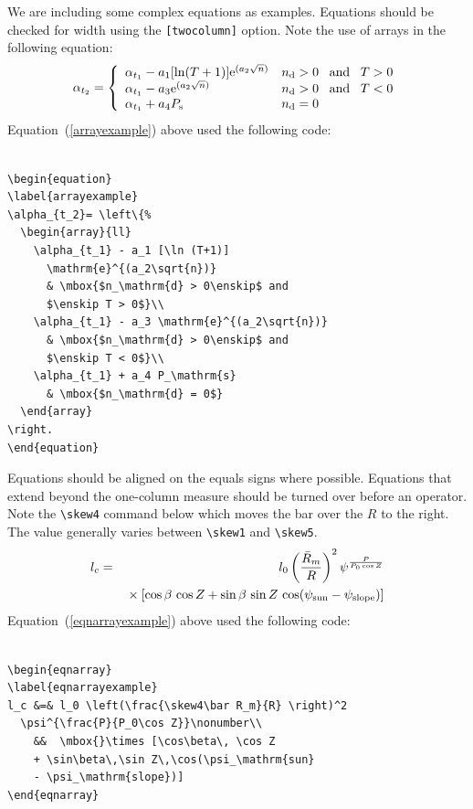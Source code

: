 \documentclass[twocolumn]{igs}
\begin{document}
We are including some complex equations as examples. Equations should be checked for width using the \verb"[twocolumn]" option. Note the use of arrays in the following equation:
\begin{equation}
\label{arrayexample}
\alpha_{t_2}= \left\{%
  \begin{array}{ll}
    \alpha_{t_1} - a_1 [\ln (T+1)]
      \mathrm{e}^{(a_2\sqrt{n})}
      & \mbox{$n_\mathrm{d} > 0\enskip$ and
      $\enskip T > 0$}\\
    \alpha_{t_1} - a_3 \mathrm{e}^{(a_2\sqrt{n})}
      & \mbox{$n_\mathrm{d} > 0\enskip$ and
      $\enskip T < 0$}\\
    \alpha_{t_1} + a_4 P_\mathrm{s}
      & \mbox{$n_\mathrm{d} = 0$}
  \end{array}
\right.
\end{equation}
Equation~(\ref{arrayexample}) above used the following code:
\begin{verbatim}

\begin{equation}
\label{arrayexample}
\alpha_{t_2}= \left\{%
  \begin{array}{ll}
    \alpha_{t_1} - a_1 [\ln (T+1)]
      \mathrm{e}^{(a_2\sqrt{n})}
      & \mbox{$n_\mathrm{d} > 0\enskip$ and
      $\enskip T > 0$}\\
    \alpha_{t_1} - a_3 \mathrm{e}^{(a_2\sqrt{n})}
      & \mbox{$n_\mathrm{d} > 0\enskip$ and
      $\enskip T < 0$}\\
    \alpha_{t_1} + a_4 P_\mathrm{s}
      & \mbox{$n_\mathrm{d} = 0$}
  \end{array}
\right.
\end{equation}

\end{verbatim}
Equations should be aligned on the equals signs where possible. Equations that extend beyond the one-column measure should be turned over before an operator. Note the \verb"\skew4" command below which moves the bar over the $R$ to the right. The value generally varies between \verb"\skew1" and \verb"\skew5".
\begin{eqnarray}
\label{eqnarrayexample}
l_c &=& l_0 \left(\frac{\skew4\bar R_m}{R} \right)^2
  \psi^{\frac{P}{P_0\cos Z}}\nonumber\\
    &&  \mbox{}\times [\cos\beta\, \cos Z
    + \sin\beta\,\sin Z\,\cos(\psi_\mathrm{sun}
    - \psi_\mathrm{slope})]
\end{eqnarray}
Equation~(\ref{eqnarrayexample}) above used the following code:
\begin{verbatim}

\begin{eqnarray}
\label{eqnarrayexample}
l_c &=& l_0 \left(\frac{\skew4\bar R_m}{R} \right)^2
  \psi^{\frac{P}{P_0\cos Z}}\nonumber\\
    &&  \mbox{}\times [\cos\beta\, \cos Z
    + \sin\beta\,\sin Z\,\cos(\psi_\mathrm{sun}
    - \psi_\mathrm{slope})]
\end{eqnarray}

\end{verbatim}
\end{document}
